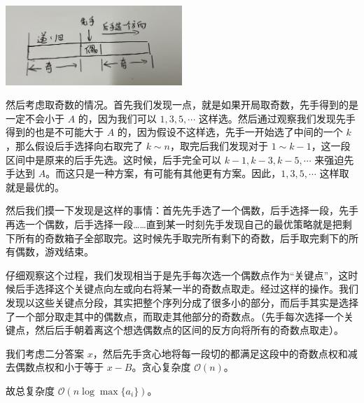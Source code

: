 \begin{center}
    \includegraphics[width=0.5\textwidth]{solutions/img/agc026f/agc026f_1.jpg}
\end{center}

然后考虑取奇数的情况。首先我们发现一点，就是如果开局取奇数，先手得到的是一定不会小于 $A$ 的，因为我们可以 $1, 3, 5, \cdots$ 这样选。然后通过观察我们发现先手得到的也是不可能大于 $A$ 的，因为假设不这样选，先手一开始选了中间的一个 $k$，那么假设后手选择向右取完了 $k\sim n$，取完后我们发现对于 $1\sim k-1$，这一段区间中是原来的后手先选。这时候，后手完全可以 $k-1, k-3, k-5, \cdots$ 来强迫先手达到 $A$。而这只是一种方案，有可能有其他更有方案。因此，$1, 3, 5, \cdots$ 这样取就是最优的。

然后我们摸一下发现是这样的事情：首先先手选了一个偶数，后手选择一段，先手再选一个偶数，后手选择一段……直到某一时刻先手发现自己的最优策略就是把剩下所有的奇数箱子全部取完。这时候先手取完所有剩下的奇数，后手取完剩下的所有偶数，游戏结束。

仔细观察这个过程，我们发现相当于是先手每次选一个偶数点作为“关键点”，这时候后手选择这个关键点向左或向右将某一半的奇数点取走。经过这样的操作。我们发现以这些关键点分段，其实把整个序列分成了很多小的部分，而后手其实是选择了一个部分取走其中的偶数点，而取走其他部分的奇数点。（先手每次选择一个关键点，然后后手朝着离这个想选偶数点的区间的反方向将所有的奇数点取走）。

我们考虑二分答案 $x$，然后先手贪心地将每一段切的都满足这段中的奇数点权和减去偶数点权和小于等于 $x-B$。贪心复杂度 $\mathcal{O}(n)$。

故总复杂度 $\mathcal{O}(n\log\max\{a_i\})$。